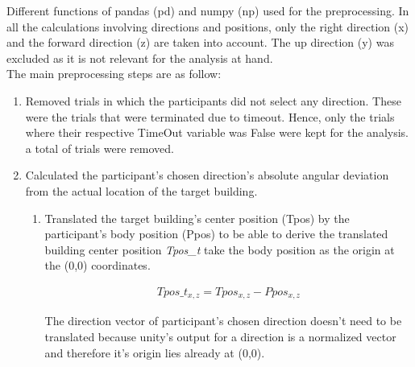 Different functions of pandas {\emphasize (pd)} and numpy {\emphasize (np)} used for the preprocessing. In all the calculations involving directions and positions, only the right direction (x) and the forward direction (z) are taken into account. The up direction (y) was excluded as it is not relevant for the analysis at hand. \\

The main preprocessing steps are as follow:

\begin{enumerate}
	\item Removed trials in which the participants did not select any direction. These were the trials that were terminated due to timeout. Hence, only the trials where their respective TimeOut variable was False were kept for the analysis. a total of  trials were removed. \\
	
	\item Calculated the participant's chosen direction's absolute angular deviation from the actual location of the target building.
	
	\begin{enumerate}
		\item Translated the target building's center position {\emphasize(Tpos)} by the participant's body position {\emphasize(Ppos)} to be able to derive the translated building center position {\emph{Tpos\_t}} take the body position as the origin at the (0,0) coordinates.
		
			\begin{align*}
				Tpos\_t_{x,z}= Tpos_{x,z} - Ppos_{x,z}
			\end{align*}
		
		The direction vector of participant's chosen direction doesn't need to be translated because unity's output for a direction is a normalized vector and therefore it's origin lies already at (0,0).\\
		

\end{enumerate}
\end{enumerate}
